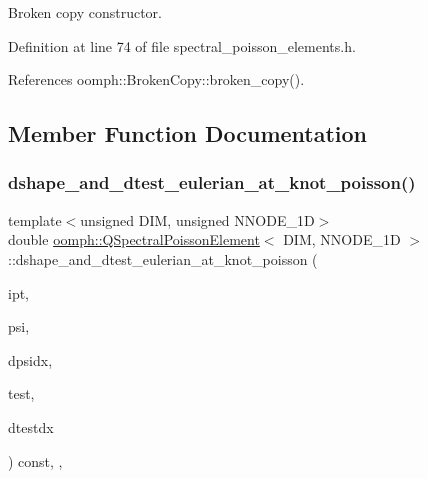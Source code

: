 Broken copy constructor. 



Definition at line 74 of file spectral\+\_\+poisson\+\_\+elements.\+h.



References oomph\+::\+Broken\+Copy\+::broken\+\_\+copy().



\subsection{Member Function Documentation}
\mbox{\label{classoomph_1_1QSpectralPoissonElement_a294aee49389f189dc34724737aa26efe}} 
\subsubsection{\texorpdfstring{dshape\+\_\+and\+\_\+dtest\+\_\+eulerian\+\_\+at\+\_\+knot\+\_\+poisson()}{dshape\_and\_dtest\_eulerian\_at\_knot\_poisson()}\hspace{0.1cm}{\footnotesize\ttfamily [1/2]}}
{\footnotesize\ttfamily template$<$unsigned D\+IM, unsigned N\+N\+O\+D\+E\+\_\+1D$>$ \\
double \hyperlink{classoomph_1_1QSpectralPoissonElement}{oomph\+::\+Q\+Spectral\+Poisson\+Element}$<$ D\+IM, N\+N\+O\+D\+E\+\_\+1D $>$\+::dshape\+\_\+and\+\_\+dtest\+\_\+eulerian\+\_\+at\+\_\+knot\+\_\+poisson (\begin{DoxyParamCaption}\item[{const unsigned \&}]{ipt,  }\item[{\hyperlink{classoomph_1_1Shape}{Shape} \&}]{psi,  }\item[{\hyperlink{classoomph_1_1DShape}{D\+Shape} \&}]{dpsidx,  }\item[{\hyperlink{classoomph_1_1Shape}{Shape} \&}]{test,  }\item[{\hyperlink{classoomph_1_1DShape}{D\+Shape} \&}]{dtestdx }\end{DoxyParamCaption}) const\hspace{0.3cm}{\ttfamily [inline]}, {\ttfamily [protected]}, {\ttfamily [virtual]}}




